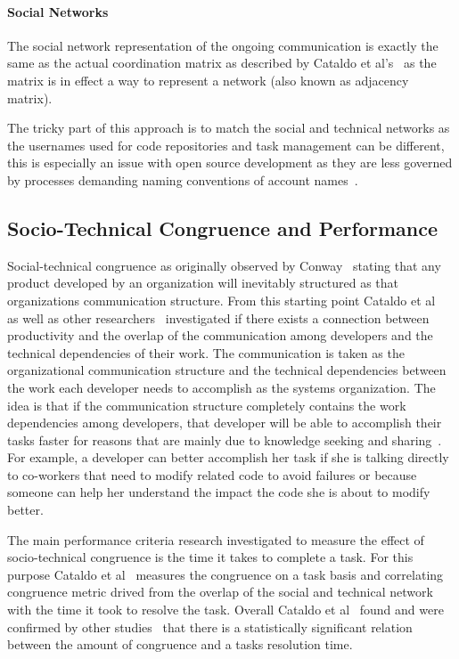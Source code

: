 \paragraph{Social Networks}
The social network representation of the ongoing communication is exactly the same as the actual coordination matrix as described by Cataldo et al's~\cite{cataldo:cscw:2006} as the matrix is in effect a way to represent a network (also known as adjacency matrix).

The tricky part of this approach is to match the social and technical networks as the usernames used for code repositories and task management can be different, this is especially an issue with open source development as they are less governed by processes demanding naming conventions of account names~\cite{schroeter:isese:2006}.

\subsection{Socio-Technical Congruence and Performance}
Social-technical congruence as originally observed by Conway~\cite{conway:datamination:1968} stating that any product developed by an organization will inevitably structured as that organizations communication structure.
From this starting point Cataldo et al~\cite{cataldo:cscw:2006} as well as other researchers~\cite{valetto:msr:2007,ducheneaut:cscw:2005,ehrlich:stc:2008} investigated if there exists a connection between productivity and the overlap of the communication among developers and the technical dependencies of their work.
The communication is taken as the organizational communication structure and the technical dependencies between the work each developer needs to accomplish as the systems organization.
The idea is that if the communication structure completely contains the work dependencies among developers, that developer will be able to accomplish their tasks faster for reasons that are mainly due to knowledge seeking and sharing~\cite{desouza2006:knowledge}.
For example, a developer can better accomplish her task if she is talking directly to co-workers that need to modify related code to avoid failures or because someone can help her understand the impact the code she is about to modify better.

The main performance criteria research investigated to measure the effect of socio-technical congruence is the time it takes to complete a task.
For this purpose Cataldo et al~\cite{cataldo:cscw:2006} measures the congruence on a task basis and correlating congruence metric drived from the overlap of the social and technical network with the time it took to resolve the task.
Overall Cataldo et al~\cite{cataldo:cscw:2006} found and were confirmed by other studies~\cite{valetto:msr:2007,ehrlich:stc:2008} that there is a statistically significant relation between the amount of congruence and a tasks resolution time.

